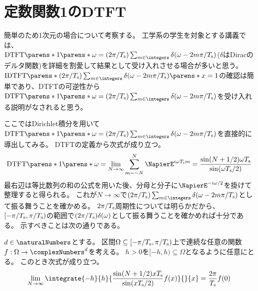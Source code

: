     \section{定数関数1のDTFT}
        \label{定数関数1のDTFT}
        簡単のため1次元の場合について考察する。
        工学系の学生を対象とする講義では、\\
        $\DTFTwithArg{1}{\omega} = (2\pi/\Ts)\sum_{m\in\integers}\delta(\omega-2m\pi/\Ts)$($\delta$はDiracのデルタ関数)を詳細を割愛して結果として受け入れさせる場合が多いと思う。
        $\IDTFTwithArg{(2\pi/\Ts)\sum_{m\in\integers}\delta(\omega-2m\pi/\Ts)}{x}=1$の確認は簡単であり、DTFTの可逆性から$\DTFTwithArg{1}{\omega} = (2\pi/\Ts)\sum_{m\in\integers}\delta(\omega-2m\pi/\Ts)$を受け入れる説明がなされると思う。
        \par
        ここではDirichlet積分を用いて$\DTFTwithArg{1}{\omega} = (2\pi/\Ts)\sum_{m\in\integers}\delta(\omega-2m\pi/\Ts)$を直接的に導出してみる。
        DTFTの定義から次式が成り立つ。
        \[
            \DTFTwithArg{1}{\omega} = \lim_{N\to\infty} \sum_{m=-N}^N \NapierE^{i\omega \Ts m} = \frac{\sin(N+1/2)\omega \Ts}{\sin(\omega \Ts/2)}
        \]
        最右辺は等比数列の和の公式を用いた後、分母と分子に$\NapierE^{-i\omega/2}$を掛けて整理すると得られる。
        これが$N\to\infty$で$(2\pi/\Ts)\sum_{m\in\integers}\delta(\omega-2m\pi/\Ts)$として振る舞うことを確かめる。
        $2\pi/T_\text{s}$周期性については明らかだから、$[-\pi/T_\text{s},\pi/T_\text{s})$の範囲で$(2\pi/T_\text{s})\delta(\omega)$として振る舞うことを確かめれば十分である。
        示すべきことは次の通りである。
        \begin{shadebox}
            $d\in\naturalNumbers$とする。
            区間$\Omega \subseteq [-\pi/T_\text{s},\pi/T_\text{s})$上で連続な任意の関数$f:\Omega\to\complexNumbers^d$を考える。
            $h>0$を$[-h,h) \subseteq \Omega$となるように任意にとる。
            このとき次式が成り立つ。
            \[
                \lim_{N\to\infty} \integrate{-h}{h}{\frac{\sin(N+1/2)x \Ts}{\sin(x \Ts/2)} f(x)}{}{x} = \frac{2\pi}{\Ts} f(0)
            \]
        \end{shadebox}
